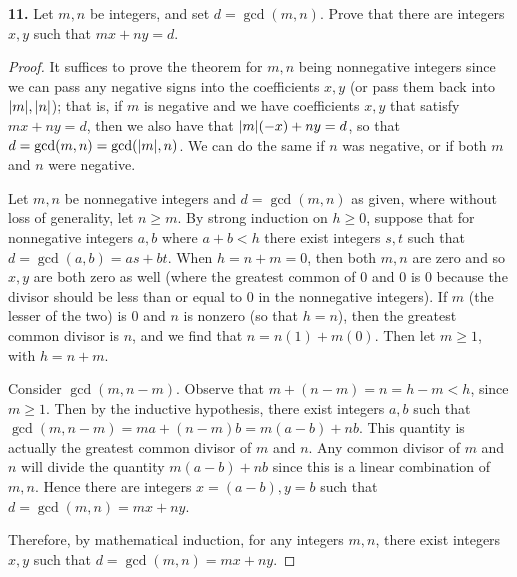 \documentclass[11pt]{article}
\begin{document}
\textbf{11.} Let $m,n$ be integers, and set $d = \gcd(m,n)$. Prove that there are integers $x,y$ such that $mx+ny = d$.
\begin{proof}
    It suffices to prove the theorem for $m,n$ being nonnegative integers since we can pass any negative signs into the coefficients $x,y$ (or pass them back into $\abs{m},\abs{n}$); that is, if $m$ is negative and we have coefficients $x,y$ that satisfy $mx+ny = d$, then we also have that $\abs{m}(-x) + ny = d$, so that $d = \gcd(m,n) = \gcd(\abs{m},n)$. We can do the same if $n$ was negative, or if both $m$ and $n$ were negative.

    Let $m,n$ be nonnegative integers and $d = \gcd(m,n)$ as given, where without loss of generality, let $n\geq m$. By strong induction on $h\geq 0$, suppose that for nonnegative integers $a,b$ where $a+b < h$ there exist integers $s,t$ such that $d = \gcd(a,b) = as+bt$. When $h = n+m = 0$, then both $m,n$ are zero and so $x,y$ are both zero as well (where the greatest common of $0$ and $0$ is $0$ because the divisor should be less than or equal to $0$ in the nonnegative integers). If $m$ (the lesser of the two) is $0$ and $n$ is nonzero (so that $h = n$), then the greatest common divisor is $n$, and we find that $n = n(1) + m(0)$. Then let $m\geq 1$, with $h = n+m$.

    Consider $\gcd(m,n-m)$. Observe that $m+(n-m) = n = h-m < h$, since $m\geq 1$. Then by the inductive hypothesis, there exist integers $a,b$ such that $\gcd(m,n-m) = ma+(n-m)b = m(a-b) + nb$. This quantity is actually the greatest common divisor of $m$ and $n$. Any common divisor of $m$ and $n$ will divide the quantity $m(a-b) + nb$ since this is a linear combination of $m,n$. Hence there are integers $x = (a-b), y = b$ such that $d = \gcd(m,n) = mx+ny$.

    Therefore, by mathematical induction, for any integers $m,n$, there exist integers $x,y$ such that $d = \gcd(m,n) = mx+ny$.
\end{proof}
\end{document}
